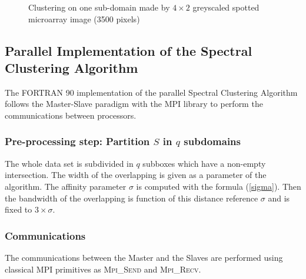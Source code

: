 \documentclass[runningheads,a4paper]{llncs}
\begin{document}
\begin{figure}
  \begin{center}
    \hspace{0.2cm}
 \end{center}
\caption{Clustering on one sub-domain made by $4 \times 2$ greyscaled spotted microarray image (3500 pixels) }  
\label{fig:sparseaff}
\end{figure}

\subsection{Parallel Implementation of the Spectral Clustering Algorithm}

The FORTRAN 90 implementation of the parallel Spectral Clustering Algorithm
follows the Master-Slave paradigm with the MPI library to perform the
communications between processors.

\subsubsection{Pre-processing step: Partition  $S$ in $q$ subdomains}

The whole data set is subdivided in $q$ subboxes which have a non-empty
intersection. The width of the overlapping is given as a parameter of the
algorithm.
The affinity parameter $\sigma$ is computed with the formula (\ref{sigma}).
Then the bandwidth of the overlapping is function of this distance reference
$\sigma$ and is fixed to $3\times \sigma$.

\subsubsection{Communications}
The communications between the Master and the Slaves are performed using
classical MPI primitives as \textsc{Mpi\_Send} and \textsc{Mpi\_Recv}.
\end{document}
